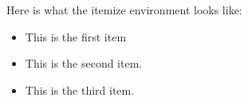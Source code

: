 \documentclass{article}               %
\begin{document}

Here is what the itemize environment looks like:

\begin{itemize}
  \item This is the first item
  \item This is the second item.
  \item This is the third item.
\end{itemize}
\end{document}
